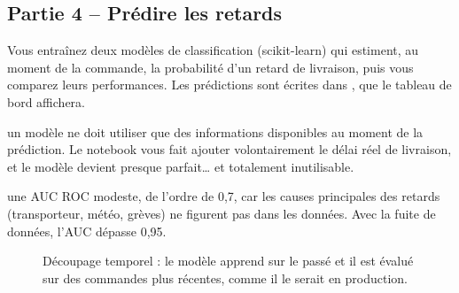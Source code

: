 \subsection*{Partie 4 -- Prédire les retards \hfill {}}

Vous entraînez deux modèles de classification (scikit-learn) qui estiment, au moment de la commande,
la probabilité d'un retard de livraison, puis vous comparez leurs performances. Les prédictions sont
écrites dans , que le tableau de bord affichera.

\begin{notion}
un modèle ne doit utiliser que des informations disponibles au moment de
la prédiction. Le notebook vous fait ajouter volontairement le délai réel de livraison, et
le modèle devient presque parfait\dots{} et totalement inutilisable.
\end{notion}

\begin{resultat}
une AUC ROC modeste, de l'ordre de 0,7, car les causes principales des retards (transporteur, météo,
grèves) ne figurent pas dans les données. Avec la fuite de données, l'AUC dépasse 0,95.
\end{resultat}


\begin{figure}[H]
\centering
{}
\caption{Découpage temporel : le modèle apprend sur le passé et il est évalué sur des commandes
plus récentes, comme il le serait en production.}
\label{c3:fig:split}
\end{figure}

